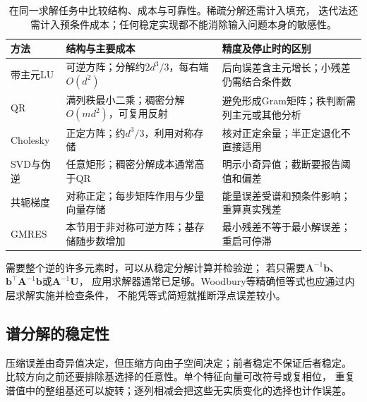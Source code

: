 \begin{table}[htbp]
 \centering\small
 \begin{tabularx}{\linewidth}{@{}lXX@{}}
 \toprule
 方法 & 结构与主要成本 & 精度及停止时的区别\\
 \midrule
 带主元LU & 可逆方阵；分解约$2d^3/3$，每右端$O(d^2)$
 & 后向误差含主元增长；小残差仍需结合条件数\\
 QR & 满列秩最小二乘；稠密分解$O(md^2)$，可复用反射
 & 避免形成Gram矩阵；秩判断需列主元或其他分析\\
 Cholesky & 正定方阵；约$d^3/3$，利用对称存储
 & 核对正定余量；半正定退化不直接适用\\
 SVD与伪逆 & 任意矩形；稠密分解成本通常高于QR
 & 明示小奇异值；截断要报告阈值和偏差\\
 共轭梯度 & 对称正定；每步矩阵作用与少量向量存储
 & 能量误差受谱和预条件影响；重算真实残差\\
 GMRES & 本节用于非对称可逆方阵；基存储随步数增加
 & 最小残差不等于最小解误差；重启可停滞\\
 \bottomrule
 \end{tabularx}
 \caption{在同一求解任务中比较结构、成本与可靠性。稀疏分解还需计入填充，
 迭代法还需计入预条件成本；任何稳定实现都不能消除输入问题本身的敏感性。}
 \label{tab:matrix-analysis-solver-conditions}
\end{table}

需要整个逆的许多元素时，可以从稳定分解计算并检验逆；
若只需要$\bm A^{-1}\bm b$、$\bm b^\top\bm A^{-1}\bm b$或$\bm A^{-1}\bm U$，
应用求解器通常已足够。Woodbury等精确恒等式也应通过内层求解实施并检查条件，
不能凭等式简短就推断浮点误差较小。


\subsection{谱分解的稳定性}
\label{sec:linear-algebra-spectral-stability}
\label{sec:ch06-spectral-stability}


压缩误差由奇异值决定，但压缩方向由子空间决定；前者稳定不保证后者稳定。
比较方向之前还要排除基选择的任意性。单个特征向量可改符号或复相位，
重复谱值中的整组基还可以旋转；逐列相减会把这些无实质变化的选择也计作误差。


